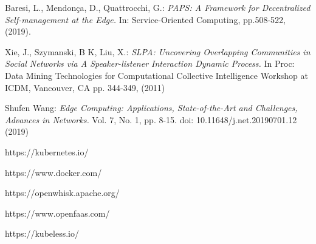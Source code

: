 \begin{thebibliography}{9}
        Baresi, L., Mendonça, D., Quattrocchi, G.: 
        \textit{PAPS: A Framework for Decentralized Self-management at the Edge.}
        In: Service-Oriented Computing, pp.508-522, (2019).   

        Xie, J., Szymanski, B K, Liu, X.:
        \textit{SLPA: Uncovering Overlapping Communities in Social Networks via
        A Speaker-listener Interaction Dynamic Process.}
        In Proc: Data Mining Technologies for Computational Collective 
        Intelligence Workshop at ICDM, Vancouver, CA pp. 344-349, (2011)

        Shufen Wang:
        \textit{Edge Computing: Applications, State-of-the-Art and Challenges, Advances in Networks.}
        Vol. 7, No. 1, pp. 8-15. doi: 10.11648/j.net.20190701.12 (2019)

        https://kubernetes.io/

        https://www.docker.com/

        https://openwhisk.apache.org/

        https://www.openfaas.com/

        https://kubeless.io/

\end{thebibliography}